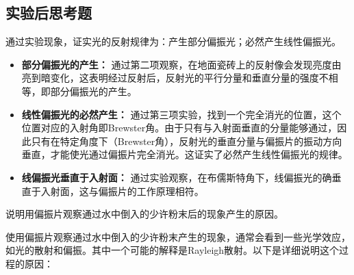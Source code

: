 \documentclass[dvipsnames, svgnames,a4paper,11pt]{article}
\begin{document}
	
	\subsection{实验后思考题}
	
	\begin{question}
		通过实验现象，证实光的反射规律为：产生部分偏振光；必然产生线性偏振光。
	\end{question}
	\begin{itemize}
		\item \textbf{部分偏振光的产生：} 通过第二项观察，在地面瓷砖上的反射像会发现亮度由亮到暗变化，这表明经过反射后，反射光的平行分量和垂直分量的强度不相等，即部分偏振光的产生。
		
		\item \textbf{线性偏振光的必然产生：} 通过第三项实验，找到一个完全消光的位置，这个位置对应的入射角即Brewster角。由于只有与入射面垂直的分量能够通过，因此只有在特定角度下（Brewster角），反射光的垂直分量与偏振片的振动方向垂直，才能使光通过偏振片完全消光。这证实了必然产生线性偏振光的规律。
		
		\item \textbf{线偏振光垂直于入射面：} 通过实验观察，在布儒斯特角下，线偏振光的确垂直于入射面，这与偏振片的工作原理相符。
	\end{itemize}
	
	
	\begin{question}
		说明用偏振片观察通过水中倒入的少许粉末后的现象产生的原因。
	\end{question}
	使用偏振片观察通过水中倒入的少许粉末产生的现象，通常会看到一些光学效应，如光的散射和偏振。其中一个可能的解释是Rayleigh散射。以下是详细说明这个过程的原因：
	
\end{document}
